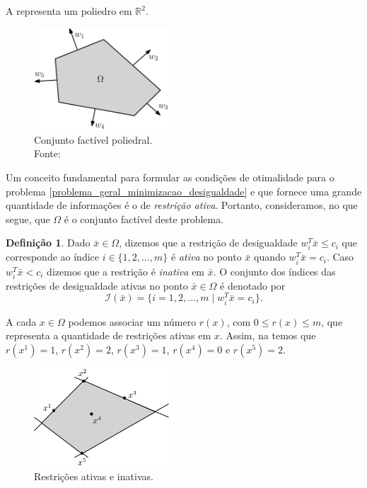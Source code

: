 \documentclass[12pt,a4paper]{scrartcl}
\def\RR{\mathds{R}}
\def\xbar{\bar{x}}
\theoremstyle{definition}%
\newtheorem{defi}{Definição}
\newtheorem{obs}{Observação}
\begin{document}
A  representa um poliedro em $\RR^{2}$.

\begin{figure}[!ht] 
	\centering
	\includegraphics[width=0.45\textwidth]{conjunto_factivel_poliedral}
	\caption{Conjunto factível poliedral. \\ Fonte: \textcite{Ana1994} \label{fig:regiao_factivel_poliedro}}
\end{figure}

Um conceito fundamental para formular as condições de otimalidade para o problema \eqref{problema_geral_minimizacao_desigualdade} e que fornece uma grande quantidade de informações é o de \emph{restrição ativa}. Portanto, consideramos, no que segue, que $\Omega$ é o conjunto factível deste problema.

\begin{defi}
Dado $\xbar \in \Omega$, dizemos que a restrição de desigualdade $w_{i}^{T}\bar{x} \leq c_{i}$ que corresponde ao índice $i\in \{ 1,2, \ldots , m\}$ é \emph{ativa} no ponto $\xbar$ quando $w_{i}^{T}\bar{x} = c_{i}$. Caso $w_{i}^{T}\bar{x} < c_{i}$ dizemos que a restrição é \emph{inativa} em $\xbar$. O conjunto dos índices das restrições de desigualdade ativas no ponto $\xbar \in \Omega$ é denotado por
\[
\mathcal{I} (\xbar) = \{ i = 1,2, \ldots , m \mid w_{i}^{T}\bar{x} = c_{i} \} .
\]
\end{defi} 


A cada $x\in \Omega$ podemos associar um número $r(x)$, com $0\leq r(x) \leq m$, que representa a quantidade de restrições ativas em $x$. Assim, na  temos que $r(x^{1}) = 1$, $r(x^{2}) = 2$, $r(x^{3}) = 1$, $r(x^{4}) = 0$ e $r(x^{5}) = 2$.

\begin{figure}[!ht] 
	\centering
	\includegraphics[width=0.45\textwidth]{restricoes_ativas}
	\caption{Restrições ativas e inativas. \label{fig:restricoes_ativas}}
\end{figure}
\end{document}
